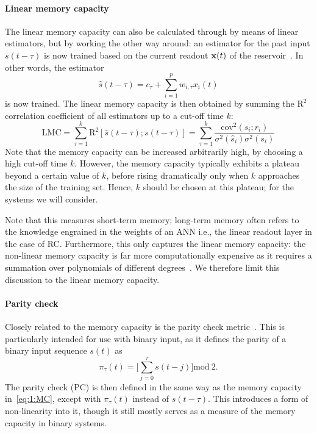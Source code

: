 \paragraph{Linear memory capacity}
The linear memory capacity can also be calculated through by means of linear estimators, but by working the other way around: an estimator for the past input $s(t - \tau)$ is now trained based on the current readout $\boldsymbol{\mathbf{x}}(t)$ of the reservoir~\cite{tsunegi2019STOforcedsyncRC,NeuromorphicFewShot}.
In other words, the estimator
\begin{equation}
	\hat{s}(t - \tau) = c_\tau + \sum_{i=1}^{p} w_{i,\tau} x_i(t)
\end{equation}
is now trained.
The linear memory capacity is then obtained by summing the $\mathrm{R}^2$ correlation coefficient of all estimators up to a cut-off time $k$:
\begin{equation}
	\label{eq:1:MC}
	\mathrm{LMC} = \sum_{\tau = 1}^{k} \mathrm{R}^2[\hat{s}(t - \tau); s(t - \tau)] = \sum_{\tau = 1}^{k} \frac{\mathrm{cov}^2(\hat{s}_i; r_i)}{\sigma^2(\hat{s}_i) \sigma^2(s_i)}
\end{equation}
Note that the memory capacity can be increased arbitrarily high, by choosing a high cut-off time $k$.
However, the memory capacity typically exhibits a plateau beyond a certain value of $k$, before rising dramatically only when $k$ approaches the size of the training set.
Hence, $k$ should be chosen at this plateau; for the systems we will consider. \par
Note that this measures short-term memory; long-term memory often refers to the knowledge engrained in the weights of an ANN i.e., the linear readout layer in the case of RC.
Furthermore, this only captures the linear memory capacity: the non-linear memory capacity is far more computationally expensive as it requires a summation over polynomials of different degrees~\cite{RCbenchmarksReview1}.
We therefore limit this discussion to the linear memory capacity.

\paragraph{Parity check}
Closely related to the memory capacity is the parity check metric~\cite{hon2021numerical,tsunegi2019STOforcedsyncRC}.
This is particularly intended for use with binary input, as it defines the parity of a binary input sequence $s(t)$ as
\begin{equation}
	\pi_\tau(t) = \Bigg[\sum_{j = 0}^{\tau} s(t - j) \Bigg] \mathrm{mod}~2 \mathrm{.}
\end{equation}
The parity check (PC) is then defined in the same way as the memory capacity in~\cref{eq:1:MC}, except with $\pi_\tau(t)$ instead of $s(t - \tau)$.
This introduces a form of non-linearity into it, though it still mostly serves as a measure of the memory capacity in binary systems.

